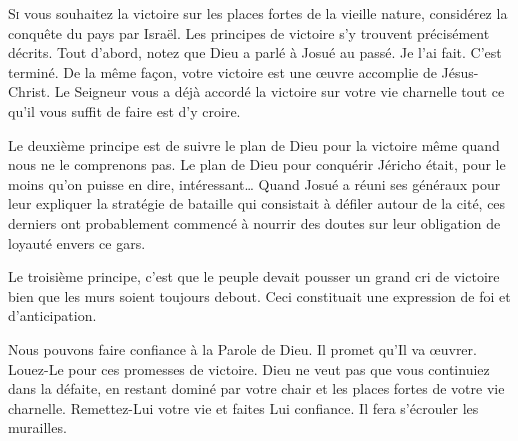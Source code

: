 



\lettrine{S}{i} vous souhaitez la victoire sur les places fortes
 de la vieille nature, considérez la conquête du pays par Israël.
 Les principes de victoire s'y trouvent précisément décrits.
 Tout d'abord, notez que Dieu a parlé à Josué au passé.
 \Og Je l'ai fait. C'est terminé. \Fg{}
 De la même fa\c{c}on, votre victoire est une \oe{}uvre accomplie de Jésus-Christ.
 Le Seigneur vous a déjà accordé la victoire sur votre vie charnelle
 \ocadr tout ce qu'il vous suffit de faire est d'y croire.

Le deuxième principe est de suivre le plan de Dieu pour la victoire
 même quand nous ne le comprenons pas.
 Le plan de Dieu pour conquérir Jéricho était,
 pour le moins qu'on puisse en dire, intéressant\dots{}
 Quand Josué a réuni ses généraux pour leur expliquer
 la stratégie de bataille qui consistait à défiler autour de la cité,
 ces derniers ont probablement commencé à nourrir des doutes
 sur leur obligation de loyauté envers ce gars.



Le troisième principe, c'est que le peuple devait pousser
 un grand cri de victoire \ocadr bien que les murs soient toujours debout.
 Ceci constituait une expression de foi et d'anticipation.

Nous pouvons faire confiance à la Parole de Dieu. Il promet qu'Il va \oe{}uvrer.
 Louez-Le pour ces promesses de victoire.
 Dieu ne veut pas que vous continuiez dans la défaite,
 en restant dominé par votre chair et les places fortes de votre vie charnelle.
 Remettez-Lui votre vie et faites Lui confiance.
 Il fera s'écrouler les murailles. 

\dvrule

